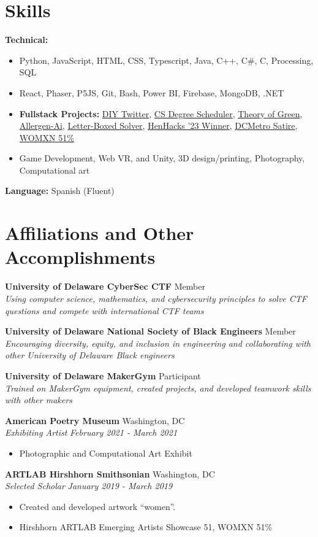 \documentclass[letterpaper,10pt]{article}
\newcommand{\entry}[4]{%
  \vspace{2pt}
  \noindent\textbf{#1} \hfill #2 \\
  \noindent\textit{#3} \hfill \textit{#4}\par
  \vspace{-2pt}
}
\begin{document}
\section{Skills}

\textbf{Technical:} 
\begin{itemize}
  \item[] Python, JavaScript, HTML, CSS, Typescript, Java, C++, C\#, C, Processing, SQL
  \item[] React, Phaser, P5JS, Git, Bash, Power BI, Firebase, MongoDB, .NET
  \item[] \textbf{Fullstack Projects:} \href{https://cisc472-bawker.web.app/}{DIY Twitter}, 
    \href{https://ud-cisc275-s22.github.io/cis-scheduler-team-17/}{CS Degree Scheduler},
    \href{https://github.com/Pink-Hat-Hacker/mvp-theoryofgreen-backup}{Theory of Green},
    \href{https://github.com/pink-hat-hacker/allergen-ai}{Allergen-Ai},
    \href{https://letter-box-solver.vercel.app/}{Letter-Boxed Solver},
    \href{https://github.com/Pink-Hat-Hacker/henhacks_floodmap}{HenHacks '23 Winner},
    \href{https://github.com/pink-hat-hacker/dc-metro-satire}{DCMetro Satire},
    \href{https://zyvphotolio.myportfolio.com/wxmen-51}{WOMXN 51\%}
  \item[] Game Development, Web VR, and Unity, 3D design/printing, Photography, Computational art
\end{itemize}
\textbf{Language:} Spanish (Fluent)

\section{Affiliations and Other Accomplishments}

\entry{University of Delaware CyberSec CTF}{Member}
  {Using computer science, mathematics, and cybersecurity principles to solve CTF questions and compete with international CTF teams}{}

\entry{University of Delaware National Society of Black Engineers}{Member}
  {Encouraging diversity, equity, and inclusion in engineering and collaborating with other University of Delaware Black engineers}{}

\entry{University of Delaware MakerGym}{Participant}
  {Trained on MakerGym equipment, created projects, and developed teamwork skills with other makers}{}

\entry{American Poetry Museum}{Washington, DC}
      {Exhibiting Artist}{February 2021 - March 2021}
      \begin{itemize}
        \item Photographic and Computational Art Exhibit
      \end{itemize}
\entry{ARTLAB Hirshhorn Smithsonian}{Washington, DC}
      {Selected Scholar}{January 2019 - March 2019}
      \begin{itemize}
        \item Created and developed artwork “women”.
        \item Hirshhorn ARTLAB Emerging Artists Showcase 51, WOMXN 51\%
      \end{itemize}
\end{document}
